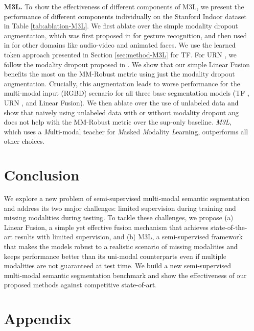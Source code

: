 \documentclass[10pt,twocolumn,letterpaper]{article}
\begin{document}
\noindent\textbf{M3L.} To show the effectiveness of different components of M3L, we present the performance of different components individually on the Stanford Indoor dataset in Table \ref{tab:ablation-M3L}. We first ablate over the simple modality dropout augmentation, which was first proposed in \cite{neverova2015moddrop} for gesture recognition, and then used in \cite{hussen2020modality, 9746613} for other domains like audio-video and animated faces. We use the learned token approach presented in Section \ref{sec:method-M3L} for TF. For URN \cite{urn}, we follow the modality dropout proposed in \cite{urn}. We show that our simple Linear Fusion benefits the most on the MM-Robust metric using just the modality dropout augmentation. Crucially, this augmentation leads to worse performance for the multi-modal input (RGBD) scenario for all three base segmentation models (TF \cite{tokenfusion}, URN \cite{urn}, and Linear Fusion). We then ablate over the use of unlabeled data and show that naively using unlabeled data with or without modality dropout aug does not help with the MM-Robust metric over the sup-only baseline. \emph{M3L}, which uses a \emph{M}ulti-modal teacher for \emph{M}asked \emph{M}odality \emph{L}earning, outperforms all other choices. \section{Conclusion}
We explore a new problem of semi-supervised multi-modal semantic segmentation and address its two major challenges: limited supervision during training and missing modalities during testing. To tackle these challenges, we propose (a) Linear Fusion, a simple yet effective fusion mechanism that achieves state-of-the-art results with limited supervision, and (b) M3L, a semi-supervised framework that makes the models robust to a realistic scenario of missing modalities and keeps performance better than its uni-modal counterparts even if multiple modalities are not guaranteed at test time. We build a new semi-supervised multi-modal semantic segmentation benchmark and show the effectiveness of our proposed methods against competitive state-of-art. {\small


}
\clearpage
\appendix
\section{Appendix}
\end{document}
